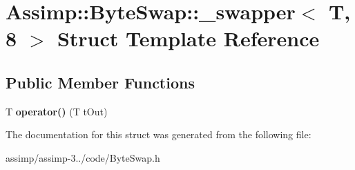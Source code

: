 \hypertarget{struct_assimp_1_1_byte_swap_1_1__swapper_3_01_t_00_018_01_4}{\section{Assimp\+:\+:Byte\+Swap\+:\+:\+\_\+swapper$<$ T, 8 $>$ Struct Template Reference}
\label{struct_assimp_1_1_byte_swap_1_1__swapper_3_01_t_00_018_01_4}
}
\subsection*{Public Member Functions}
\begin{DoxyCompactItemize}
\item 
\hypertarget{struct_assimp_1_1_byte_swap_1_1__swapper_3_01_t_00_018_01_4_a592a9813fb91dfd4508aa0650f12dd74}{T {\bfseries operator()} (T t\+Out)}\label{struct_assimp_1_1_byte_swap_1_1__swapper_3_01_t_00_018_01_4_a592a9813fb91dfd4508aa0650f12dd74}

\end{DoxyCompactItemize}


The documentation for this struct was generated from the following file\+:\begin{DoxyCompactItemize}
\item 
assimp/assimp-\/3../code/Byte\+Swap.\+h\end{DoxyCompactItemize}
